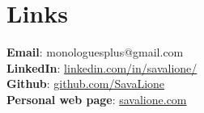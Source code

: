 \documentclass[letterpaper,11pt]{article}
\begin{document}
\section{Links}
\begin{itemize}[leftmargin=0.15in, label={}]
    \normalsize{\item{
                    \textbf{Email}{:  monologuesplus@gmail.com} \\
                    \textbf{LinkedIn}{:  \href{https://linkedin.com/in/savalione/}{linkedin.com/in/savalione/}} \\
                    \textbf{Github}{:  \href{https://github.com/SavaLione}{github.com/SavaLione}} \\
                    \textbf{Personal web page}{: \href{https://savalione.com}{savalione.com} } \\
              }}
\end{itemize}
\end{document}
